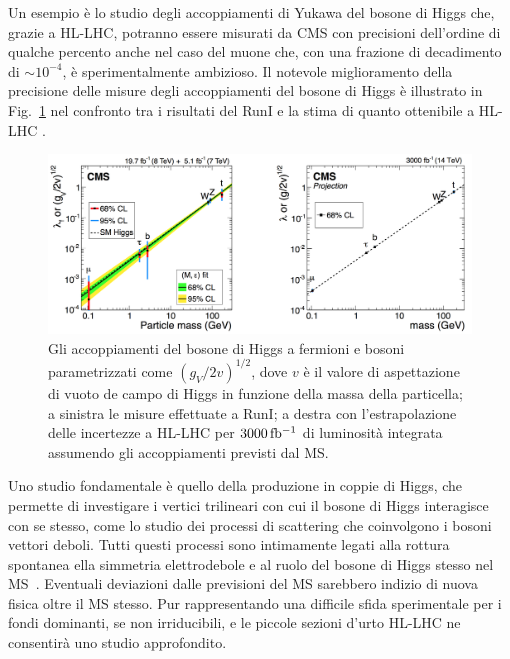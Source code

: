Un esempio \`e lo studio degli accoppiamenti di Yukawa del bosone di Higgs che, grazie a HL-LHC, potranno essere misurati da CMS con precisioni dell'ordine di qualche percento anche nel caso del muone che, con una frazione di decadimento di $\sim 10^{-4}$, \`e sperimentalmente ambizioso.
Il notevole miglioramento della precisione delle misure degli accoppiamenti del bosone di Higgs \`e illustrato in Fig.~\ref{HLLHCCouplings} nel confronto tra i risultati del RunI e la stima di quanto ottenibile a HL-LHC \cite{CMSCollaboration:2015zni,Khachatryan:2014jba}.
\begin{figure}
\centering
\includegraphics[width=\textwidth]{Immagini/HLLHC_Couplings.png}
\caption{Gli accoppiamenti del bosone di Higgs a fermioni e bosoni parametrizzati come $(g_V/2v)^{1/2}$, dove $v$ \`e il valore di aspettazione di vuoto de campo di Higgs in funzione della massa della particella; a sinistra le misure effettuate a RunI; a destra con l'estrapolazione delle incertezze a HL-LHC per $3000{\rm \, fb^{-1}}$ di luminosit\`a integrata assumendo gli accoppiamenti previsti dal MS.}
\label{HLLHCCouplings}
\end{figure}

Uno studio fondamentale \`e quello della produzione in coppie di Higgs, che permette di investigare i vertici trilineari con cui il bosone di Higgs interagisce con se stesso, come lo studio dei processi di scattering che coinvolgono i bosoni vettori deboli. Tutti questi processi sono intimamente legati alla rottura spontanea ella simmetria elettrodebole e al ruolo del bosone di Higgs stesso nel MS~\cite{CMSCollaboration:2015zni}. Eventuali deviazioni dalle previsioni del MS sarebbero indizio di nuova fisica oltre il MS stesso. Pur rappresentando una difficile sfida sperimentale per i fondi dominanti, se non irriducibili, e le piccole sezioni d'urto HL-LHC ne consentir\`a uno studio approfondito.

